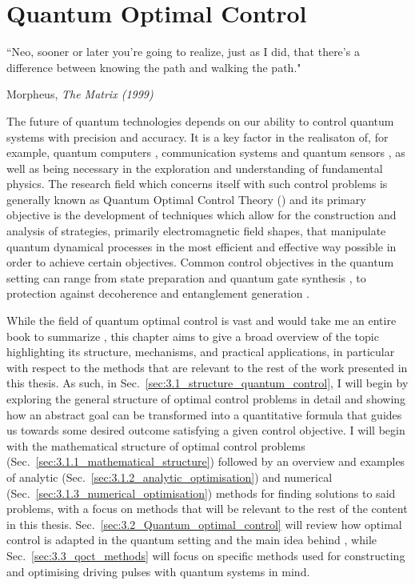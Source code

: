 \chapter{Quantum Optimal Control}\label{chap:3_Quantum_Optimal_control}
\epigraph{``Neo, sooner or later you’re going to realize, just as I did, that there’s a difference between knowing the path and walking the path."}{Morpheus, \emph{The Matrix (1999)}}

The future of quantum technologies depends on our ability to control quantum systems with precision and accuracy. It is a key factor in the realisaton of, for example, quantum computers \cite{ball_software_2021}, communication systems \cite{omran_generation_2019} and quantum sensors \cite{le_robust_2021}, as well as being necessary in the exploration and understanding of fundamental physics. The research field which concerns itself with such control problems is generally known as Quantum Optimal Control Theory () \cite{koch_quantum_2022,glaser_training_2015} and its primary objective is the development of techniques which allow for the construction and analysis of strategies, primarily electromagnetic field shapes, that manipulate quantum dynamical processes in the most efficient and effective way possible in order to achieve certain objectives. Common control objectives in the quantum setting can range from state preparation \cite{zhang_when_2019} and quantum gate synthesis \cite{pelegri_high-fidelity_2022}, to protection against decoherence \cite{rooney_decoherence_2012} and entanglement generation \cite{omran_generation_2019}.

While the field of quantum optimal control is vast and would take me an entire book to summarize \cite{dalessio_quantum_2016}, this chapter aims to give a broad overview of the topic highlighting its structure, mechanisms, and practical applications, in particular with respect to the methods that are relevant to the rest of the work presented in this thesis. As such, in Sec.~\ref{sec:3.1_structure_quantum_control}, I will begin by exploring the general structure of optimal control problems in detail and showing how an abstract goal can be transformed into a quantitative formula that guides us towards some desired outcome satisfying a given control objective. I will begin with the mathematical structure of optimal control problems (Sec.~\ref{sec:3.1.1_mathematical_structure}) followed by an overview and examples of analytic (Sec.~\ref{sec:3.1.2_analytic_optimisation}) and numerical (Sec.~\ref{sec:3.1.3_numerical_optimisation}) methods for finding solutions to said problems, with a focus on methods that will be relevant to the rest of the content in this thesis. Sec.~\ref{sec:3.2_Quantum_optimal_control} will review how optimal control is adapted in the quantum setting and the main idea behind , while Sec.~\ref{sec:3.3_qoct_methods} will focus on specific methods used for constructing and optimising driving pulses with quantum systems in mind.


